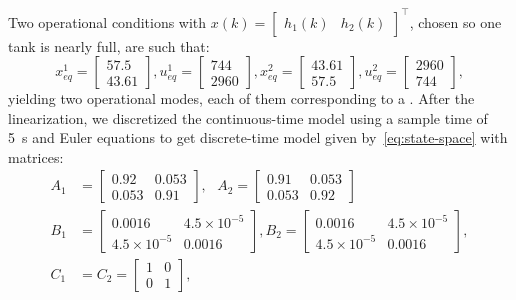 Two operational conditions with
\(x(k) = \begin{bmatrix}h_1(k) & h_2(k)\end{bmatrix}^\top{}\), chosen so one tank
is nearly full, are such that:
%
\begin{equation*}
  x_{eq}^1 =\! \begin{bmatrix}
    57.5 \\ 43.61
  \end{bmatrix}\!,
  u_{eq}^1 =\! \begin{bmatrix}
    744 \\ 2960
  \end{bmatrix}\!,
  x_{eq}^2 = \begin{bmatrix}
    43.61 \\ 57.5
  \end{bmatrix}\!,
  u_{eq}^2 =\! \begin{bmatrix}
    2960 \\ 744
  \end{bmatrix}\!,
\end{equation*}
%
yielding two operational modes, each of them corresponding to a \CG{}.\@
%
After the linearization, we discretized the continuous-time model using a sample
time of \SI{5}{\second} and Euler equations to get discrete-time model given
by~\eqref{eq:state-space} with matrices:
%
\begin{align*}
  A_1 & =
  \begin{bmatrix}
    0.92  & 0.053 \\
    0.053 & 0.91
  \end{bmatrix}, ~~~ A_2 = \begin{bmatrix}
    0.91  & 0.053 \\
    0.053 & 0.92
  \end{bmatrix} \\
  B_1 & =
  \begin{bmatrix}
    0.0016           & 4.5\times10^{-5} \\
    4.5\times10^{-5} & 0.0016
  \end{bmatrix},
  B_2 = \begin{bmatrix}
    0.0016           & 4.5\times10^{-5} \\
    4.5\times10^{-5} & 0.0016
  \end{bmatrix},                              \\
  C_1 & = C_2 =
  \begin{bmatrix}
    1 & 0 \\
    0 & 1
  \end{bmatrix},
\end{align*}
